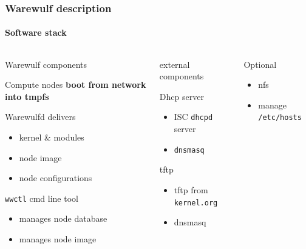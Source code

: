 \documentclass[aspectratio=169]{beamer}
\begin{document}
\begin{frame}[fragile]
\frametitle{Warewulf description}
\framesubtitle{Software stack}
\begin{columns}
  \begin{block}{Warewulf components}
  \hspace*{.1\linewidth}\begin{minipage}{.8\linewidth}
  \begin{block}{Compute nodes}
    \textbf{boot from network into tmpfs}
  \end{block}
  \begin{block}{Warewulfd delivers}
    \begin{itemize}
      \item kernel \& modules
      \item node image
      \item node configurations
    \end{itemize}
  \end{block}
  \begin{block}{\texttt{wwctl} cmd line tool}
    \begin{itemize}
      \item manages node database
      \item manages node image
    \end{itemize}
  \end{block}
  \end{minipage}
  \end{block}
  \begin{block}{external components}
  \hspace*{.1\linewidth}\begin{minipage}{.8\linewidth}
    \begin{block}{Dhcp server}
      \begin{itemize}
      \item ISC \texttt{dhcpd} server
      \item \texttt{dnsmasq}
    \end{itemize}
    \end{block}
    \begin{block}{tftp}
      \begin{itemize}
      \item tftp from \texttt{kernel.org}
      \item dnsmasq
    \end{itemize}
    \end{block}
  \end{minipage} 
  \end{block}
  \begin{block}{Optional}
    \begin{itemize}
      \item nfs
      \item manage \texttt{/etc/hosts}
    \end{itemize}
  \end{block}
\end{columns}
\end{frame}
\end{document}

